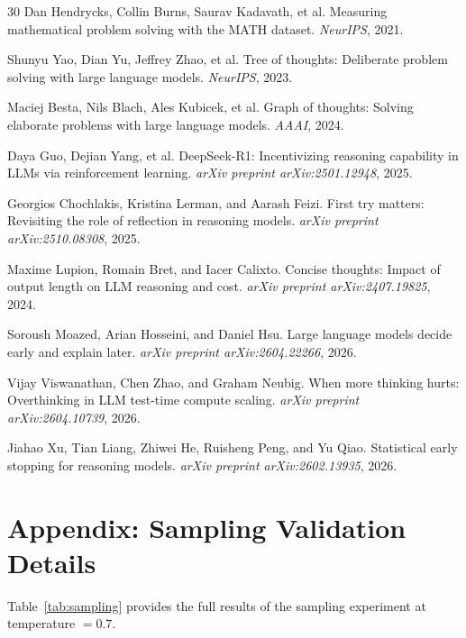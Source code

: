 \documentclass{article}
\begin{document}
\begin{thebibliography}{30}
Dan Hendrycks, Collin Burns, Saurav Kadavath, et al.
\newblock Measuring mathematical problem solving with the MATH dataset.
\newblock \emph{NeurIPS}, 2021.

Shunyu Yao, Dian Yu, Jeffrey Zhao, et al.
\newblock Tree of thoughts: Deliberate problem solving with large language models.
\newblock \emph{NeurIPS}, 2023.

Maciej Besta, Nils Blach, Ales Kubicek, et al.
\newblock Graph of thoughts: Solving elaborate problems with large language models.
\newblock \emph{AAAI}, 2024.

Daya Guo, Dejian Yang, et al.
\newblock DeepSeek-R1: Incentivizing reasoning capability in LLMs via reinforcement learning.
\newblock \emph{arXiv preprint arXiv:2501.12948}, 2025.

Georgios Chochlakis, Kristina Lerman, and Aarash Feizi.
\newblock First try matters: Revisiting the role of reflection in reasoning models.
\newblock \emph{arXiv preprint arXiv:2510.08308}, 2025.

Maxime Lupion, Romain Bret, and Iacer Calixto.
\newblock Concise thoughts: Impact of output length on LLM reasoning and cost.
\newblock \emph{arXiv preprint arXiv:2407.19825}, 2024.

Soroush Moazed, Arian Hosseini, and Daniel Hsu.
\newblock Large language models decide early and explain later.
\newblock \emph{arXiv preprint arXiv:2604.22266}, 2026.

Vijay Viswanathan, Chen Zhao, and Graham Neubig.
\newblock When more thinking hurts: Overthinking in LLM test-time compute scaling.
\newblock \emph{arXiv preprint arXiv:2604.10739}, 2026.

Jiahao Xu, Tian Liang, Zhiwei He, Ruisheng Peng, and Yu Qiao.
\newblock Statistical early stopping for reasoning models.
\newblock \emph{arXiv preprint arXiv:2602.13935}, 2026.

\end{thebibliography}

\section*{Appendix: Sampling Validation Details}

Table~\ref{tab:sampling} provides the full results of the sampling experiment at temperature $= 0.7$.
\end{document}
